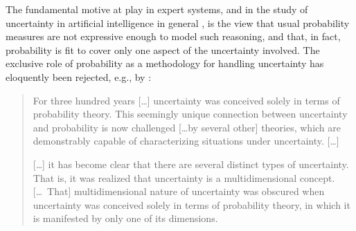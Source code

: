The fundamental motive at play in expert systems,
and in the study of uncertainty in artificial intelligence in general \parencite[see, e.g.,][]{2006:lawry},
is the view that usual probability measures
are not expressive enough to model such reasoning,
and that, in fact, probability is fit to cover only one aspect of the uncertainty involved.
The exclusive role of probability as a methodology for handling uncertainty has eloquently been rejected,
e.g., by \textcite[p.~1]{1999:klir}: 
\begin{quotation}
For three hundred years [\ldots] uncertainty was conceived solely in
terms of probability theory. This seemingly unique connection
between uncertainty and probability is now challenged [\ldots by several
other] theories, which are demonstrably capable of characterizing
situations under uncertainty. [\ldots]

[\ldots] it has become clear that there are several distinct types of
uncertainty. That is, it was realized that uncertainty is a
multidimensional concept. [\ldots\ That] multidimensional nature of
uncertainty was obscured when uncertainty was conceived solely in
terms of probability theory, in which it is manifested by only one
of its dimensions.
\end{quotation}

